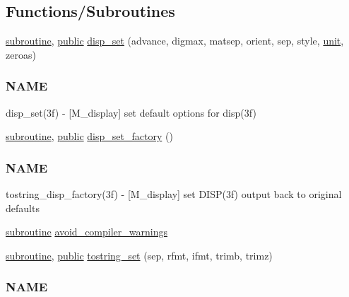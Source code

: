 \subsection*{Functions/\+Subroutines}
\begin{DoxyCompactItemize}
\item 
\hyperlink{M__stopwatch_83_8txt_acfbcff50169d691ff02d4a123ed70482}{subroutine}, \hyperlink{M__stopwatch_83_8txt_a2f74811300c361e53b430611a7d1769f}{public} \hyperlink{namespacem__display_aca571cfcf5dcced1070969200f717a28}{disp\+\_\+set} (advance, digmax, matsep, orient, sep, style, \hyperlink{M__stopwatch_83_8txt_a5cbef30eb7c0d734bd82f5a7ebea9aa7}{unit}, zeroas)
\begin{DoxyCompactList}\small\item\em \subsubsection*{N\+A\+ME}

disp\+\_\+set(3f) -\/ \mbox{[}M\+\_\+display\mbox{]} set default options for disp(3f) \end{DoxyCompactList}\item 
\hyperlink{M__stopwatch_83_8txt_acfbcff50169d691ff02d4a123ed70482}{subroutine}, \hyperlink{M__stopwatch_83_8txt_a2f74811300c361e53b430611a7d1769f}{public} \hyperlink{namespacem__display_a504ce34f82249882d1cc5a0ea2802bc6}{disp\+\_\+set\+\_\+factory} ()
\begin{DoxyCompactList}\small\item\em \subsubsection*{N\+A\+ME}

tostring\+\_\+disp\+\_\+factory(3f) -\/ \mbox{[}M\+\_\+display\mbox{]} set D\+I\+S\+P(3f) output back to original defaults \end{DoxyCompactList}\item 
\hyperlink{M__stopwatch_83_8txt_acfbcff50169d691ff02d4a123ed70482}{subroutine} \hyperlink{namespacem__display_a6200cf732096469f40c38ec2baa6d811}{avoid\+\_\+compiler\+\_\+warnings}
\item 
\hyperlink{M__stopwatch_83_8txt_acfbcff50169d691ff02d4a123ed70482}{subroutine}, \hyperlink{M__stopwatch_83_8txt_a2f74811300c361e53b430611a7d1769f}{public} \hyperlink{namespacem__display_ac6d80df8c70bb7d64df528d26851d6cb}{tostring\+\_\+set} (sep, rfmt, ifmt, trimb, trimz)
\begin{DoxyCompactList}\small\item\em \subsubsection*{N\+A\+ME}


\end{DoxyCompactList}
\end{DoxyCompactItemize}
